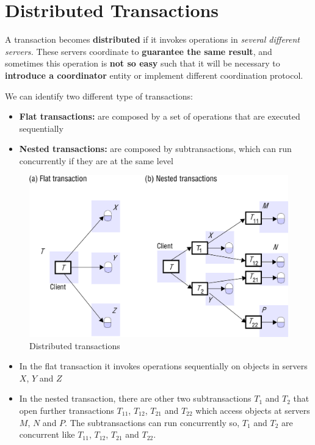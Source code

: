 \chapter{Distributed Transactions}
A transaction becomes \textbf{distributed} if it invokes operations in \textit{several different servers.} These servers coordinate to \textbf{guarantee the same result}, and sometimes this operation is \textbf{not so easy} such that it will be necessary to \textbf{introduce a coordinator} entity or implement different coordination protocol.

We can identify two different type of transactions:
\begin{itemize}
    \item \textbf{Flat transactions:} are composed by a set of operations that are executed sequentially
    \item \textbf{Nested transactions:} are composed by subtransactions, which can run concurrently if they are at the same level
\end{itemize}

\begin{figure}[!h]
    \centering
    \includegraphics[width=.60\linewidth]{images/DistributedTransactions/distTransactions.png}
    \caption{Distributed transactions}
\end{figure}

\begin{itemize}
    \item In the flat transaction it invokes operations sequentially on objects in servers \(X\), \(Y\) and \(Z\)
    \item In the nested transaction, there are other two subtransactions \(T_1\) and \(T_2\) that open further transactions \(T_{11}\), \(T_{12}\), \(T_{21}\) and \(T_{22}\) which access objects at servers \(M\), \(N\) and \(P\). The subtransactions can run concurrently so, \(T_1\) and \(T_2\) are concurrent like \(T_{11}\), \(T_{12}\), \(T_{21}\) and \(T_{22}\).
\end{itemize}

